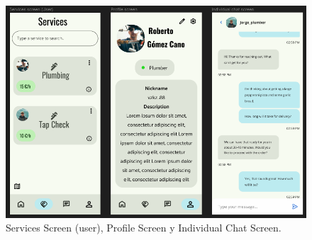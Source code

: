 \begin{figure}[h]
	\centering
	\includegraphics[width = 1\textwidth]{Imagenes/figma/figma3.png}
	\caption{Services Screen (user), Profile Screen y Individual Chat Screen.}
	\label{fig:figma3}
\end{figure}